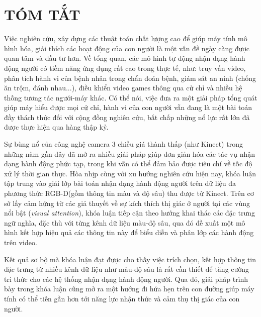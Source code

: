 \newpage
\chapter*{TÓM TẮT}

 Việc nghiên cứu, xây dựng các thuật toán chất lượng cao để giúp máy tính mô hình hóa, giải thích các hoạt động của con người là một vấn đề ngày càng được quan tâm và đầu tư hơn. Về tổng quan, các mô hình tự động nhận dạng hành động người có tiềm năng ứng dụng rất cao trong thực tế, như: truy vấn video, phân tích hành vi của bệnh nhân trong chẩn đoán bệnh, giám sát an ninh (chống ăn trộm, đánh nhau...), điều khiển video games thông qua cử chỉ và nhiều hệ thống tương tác ngưới-máy khác. Có thể nói, việc đưa ra một giải pháp tổng quát giúp máy hiểu được mọi cử chỉ, hành vi của con người vẫn đang là một bài toán đầy thách thức đối với cộng đồng nghiên cứu, bất chấp những nổ lực rất lớn đã được thực hiện qua hàng thập kỷ.
 
 Sự bùng nổ của công nghệ camera 3 chiều giá thành thấp (như Kinect) trong những năm gần đây đã mở ra nhiều giải pháp giúp đơn giản hóa các tác vụ nhận dạng hành động phức tạp, trong khi vẫn có thể đảm bảo được tiêu chí về tốc độ xử lý thời gian thực. Hòa nhịp cùng với xu hướng nghiên cứu hiện nay, khóa luận tập trung vào giải lớp bài toán nhận dạng hành động người trên dữ liệu đa phương thức RGB-D(gồm thông tin màu và độ sâu) thu được từ Kinect. Trên cơ sở lấy cảm hứng từ các giả thuyết về sự kích thích thị giác ở người tại các vùng nổi bật (\textit{visual attention}), khóa luận tiếp cận theo hướng khai thác các đặc trưng ngữ nghĩa, đặc thù với từng kênh dữ liệu màu-độ sâu, qua đó đề xuất một mô hình kết hợp hiệu quả các thông tin này để biểu diễn và phân lớp các hành động trên video. 

Kết quả sơ bộ mà khóa luận đạt được cho thấy việc trích chọn, kết hợp thông tin đặc trưng từ nhiều kênh dữ liệu như màu-độ sâu là rất cần thiết để tăng cường tri thức cho các hệ thống nhận dạng hành động người. Qua đó, giải pháp trình bày trong khóa luận cũng mở ra một hướng đi hứa hẹn trên con đường giúp máy tính có thể tiến gần hơn tới năng lực nhận thức và cảm thụ thị giác của con người.  
